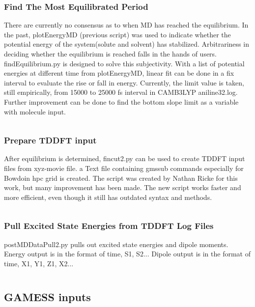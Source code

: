 \documentclass[
journal=jacsat, %
manuscript=article]{achemso}
\begin{document}
		\subsubsection{Find The Most Equilibrated Period}
			There are currently no consensus as to when MD has reached the equilibrium. In the past, plotEnergyMD (previous script) was used to indicate whether the potential energy of the system(solute and solvent) has stabilized. Arbitrariness in deciding whether the equilibrium is reached falls in the hands of users. findEquilibrium.py is designed to solve this subjectivity. With a list of potential energies at different time from plotEnergyMD, linear fit can be done in a fix interval to evaluate the rise or fall in energy. Currently, the limit value is taken, still empirically, from 15000 to 25000 fs interval in CAMB3LYP aniline32.log. Further improvement can be done to find the bottom slope limit as a variable with molecule input.
			\inputminted[linenos, breaklines, baselinestretch=1, fontsize=\small]{python}{../pythonScripts/findEquilibrium.py} 
		
		\subsubsection{Prepare TDDFT input}
			After equilibrium is determined, fincut2.py can be used to create TDDFT input files from xyz-movie file. a Text file containing gmssub commands especially for Bowdoin hpc grid is created. The script was created by Nathan Ricke for this work, but many improvement has been made. The new script works faster and more efficient, even though it still has outdated syntax and methods.
			\inputminted[linenos, breaklines, baselinestretch=1, fontsize=\small]{python}{../pythonScripts/fincut2.py} 
		
		\subsubsection{Pull Excited State Energies from TDDFT Log Files}
			postMDDataPull2.py pulls out excited state energies and dipole moments. Energy output is in the format of time, S1, S2... Dipole output is in the format of time, X1, Y1, Z1, X2...
			\inputminted[linenos, breaklines, baselinestretch=1, fontsize=\small]{python}{../pythonScripts/postMDDataPull2.py} 
		
	\subsection{GAMESS inputs}
\end{document}
